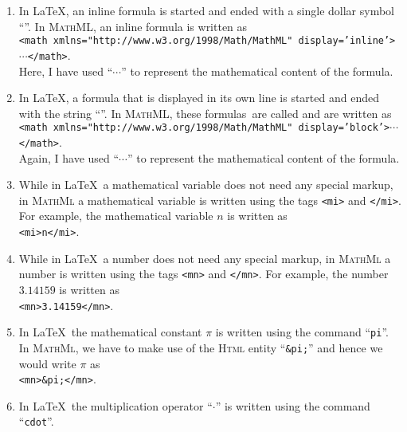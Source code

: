 \begin{enumerate}
\item In \LaTeX, an inline formula is started and ended with a single dollar symbol
      ``\texttt{}''.  
      In \textsc{MathML}, an inline formula is written as
      \\[0.2cm]
      \hspace*{1.3cm}
      \texttt{<math xmlns="http://www.w3.org/1998/Math/MathML" display='inline'>$\cdots$</math>}.
      \\[0.2cm]
      Here, I have used ``$\cdots$'' to represent the mathematical content of the formula.
\item In \LaTeX, a formula that is displayed in its own line is started and ended with the string
      ``\texttt{}''.  
      In \textsc{MathML}, these formulas\ are called  and are written as
      \\[0.2cm]
      \hspace*{1.3cm}
      \texttt{<math xmlns="http://www.w3.org/1998/Math/MathML" display='block'>$\cdots$</math>}.
      \\[0.2cm]
      Again, I have used ``$\cdots$'' to represent the mathematical content of the formula.
\item While in \LaTeX\ a mathematical variable does not need any special markup, in \textsc{MathMl}
      a mathematical variable is written using the tags 
      \texttt{<mi>} and \texttt{</mi>}.  For example, the mathematical variable $n$ is written as    
      \\[0.2cm]
      \hspace*{1.3cm}
      \texttt{<mi>n</mi>}.
\item While in \LaTeX\ a number does not need any special markup, in \textsc{MathMl}
      a number is written using the tags 
      \texttt{<mn>} and \texttt{</mn>}.  For example, the number $3.14159$ is written as    
      \\[0.2cm]
      \hspace*{1.3cm}
      \texttt{<mn>3.14159</mn>}.
\item In \LaTeX\ the mathematical constant $\pi$ is written using the command ``\texttt{pi}''.
      In \textsc{MathMl}, we have to make use of the \textsc{Html} entity ``\texttt{\&pi;}'' and
      hence we would write $\pi$ as
      \\[0.2cm]
      \hspace*{1.3cm}
      \texttt{<mn>\&pi;</mn>}.
\item In \LaTeX\ the multiplication operator ``$\cdot$'' is written using the command ``\texttt{cdot}''.

\end{enumerate}
